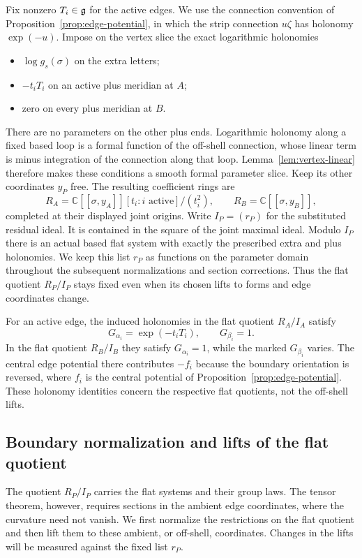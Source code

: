 Fix nonzero $T_i\in\mathfrak{g}$ for the active edges.  We use the connection
convention of Proposition~\ref{prop:edge-potential}, in which the strip
connection $u\zeta$ has holonomy $\exp(-u)$.  Impose on the vertex slice
the exact logarithmic holonomies
\begin{itemize}
\item $\log g_s(\sigma)$ on the extra letters;
\item $-t_iT_i$ on an active plus meridian at $A$;
\item zero on every plus meridian at $B$.
\end{itemize}
There are no parameters on the other plus ends.  Logarithmic holonomy
along a fixed based loop is a formal function of the off-shell
connection, whose linear term is minus integration of the connection along
that loop.  Lemma~\ref{lem:vertex-linear} therefore makes these conditions
a smooth formal parameter slice.  Keep its other coordinates $y_P$
free.  The resulting coefficient rings are
\[
 R_A=\mathbb C[[\sigma,y_A]][t_i:i\text{ active}]/(t_i^2),
 \qquad R_B=\mathbb C[[\sigma,y_B]],
\]
completed at their displayed joint origins.  Write $I_P=(r_P)$ for the
substituted residual ideal.  It is contained in the square of the joint
maximal ideal.  Modulo $I_P$ there is an actual based flat system with
exactly the prescribed extra and plus holonomies.  We keep this list
$r_P$ as functions on the parameter domain throughout the subsequent
normalizations and section corrections.  Thus the flat quotient
$R_P/I_P$ stays fixed even when its chosen lifts to forms and edge
coordinates change.

For an active edge, the induced holonomies in the flat quotient
$R_A/I_A$ satisfy
\[
 G_{\alpha_i}=\exp(-t_iT_i),\qquad G_{\beta_i}=1.
\]
In the flat quotient $R_B/I_B$ they satisfy $G_{\alpha_i}=1$, while the
marked $G_{\beta_i}$ varies.  The central edge potential there contributes
$-f_i$ because the boundary orientation is reversed, where $f_i$ is the
central potential of Proposition~\ref{prop:edge-potential}.  These
holonomy identities concern the respective flat quotients, not the
off-shell lifts.

\subsection{Boundary normalization and lifts of the flat quotient}

The quotient $R_P/I_P$ carries the flat systems and their group laws.
The tensor theorem, however, requires sections in the ambient edge
coordinates, where the curvature need not vanish.  We first normalize
the restrictions on the flat quotient and then lift them to these
ambient, or off-shell, coordinates.  Changes in the lifts will be
measured against the fixed list $r_P$.

